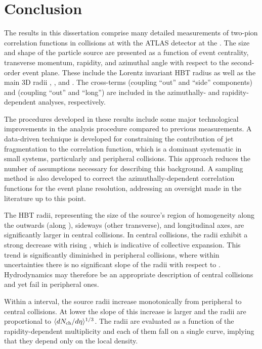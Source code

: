 \chapter{Conclusion}
\label{ch:conclusion}

The results in this dissertation comprise many detailed measurements of two-pion correlation functions in \pPb collisions at \pPbenergy with the ATLAS detector at the \lhc.
The size and shape of the particle source are presented as a function of event centrality, transverse momentum, rapidity, and azimuthal angle with respect to the second-order event plane.
These include the Lorentz invariant \ac{HBT} radius \Rinv as well as the main 3D radii \Rout, \Rside, and \Rlong.
The cross-terms \Ros (coupling ``out'' and ``side'' components) and \Rol (coupling ``out'' and ``long'') are included in the azimuthally- and rapidity-dependent analyses, respectively.

The procedures developed in these results include some major technological improvements in the analysis procedure compared to previous measurements.
A data-driven technique is developed for constraining the contribution of jet fragmentation to the correlation function, which is a dominant systematic in small systems, particularly \pp and peripheral \pA collisions.
This approach reduces the number of assumptions necessary for describing this background.
A sampling method is also developed to correct the azimuthally-dependent correlation functions for the event plane resolution, addressing an oversight made in the literature up to this point.

The \ac{HBT} radii, representing the size of the source's region of homogeneity along the outwards (along \kt), sideways (other transverse), and longitudinal axes, are significantly larger in central collisions.
In central collisions, the radii exhibit a strong decrease with rising \kt, which is indicative of collective expansion.
This trend is significantly diminished in peripheral collisions, where within uncertainties there is no significant slope of the radii with respect to \kt.
Hydrodynamics may therefore be an appropriate description of central \pPb collisions and yet fail in peripheral ones.

Within a \kt interval, the source radii increase monotonically from peripheral to central collisions.
At lower \kt the slope of this increase is larger and the radii are proportional to \(\langle d\mbox{$N_{\mathrm{ch}}$}/d\eta\rangle^{1/3}\).
The radii are evaluated as a function of the rapidity-dependent multiplicity \dNdy and each of them fall on a single curve, implying that they depend only on the local density.


